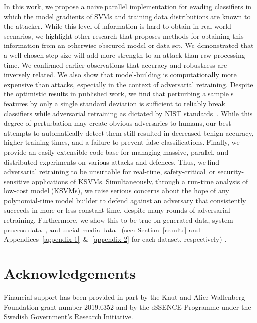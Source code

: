 \documentclass[fonts]{icst}
\begin{document}
In this work, we propose a naive parallel implementation for evading classifiers in which the model gradients of SVMs and training data distributions are known to the attacker.
While this level of information is hard to obtain in real-world scenarios, we highlight other research that proposes methods for obtaining this information from an otherwise obscured model or data-set.
We demonstrated that a   well-chosen step size will add more strength to an attack than raw processing time.
We confirmed earlier observations that accuracy and robustness are inversely related.
We also show that model-building is computationally more expensive than attacks, especially in the context of adversarial retraining.
Despite the optimistic results in published work, we find that perturbing a sample's features by only a single standard deviation is sufficient to reliably break classifiers while adversarial retraining as dictated by NIST standards~\cite{falco2006using}.
While this degree of perturbation may create obvious adversaries to humans, our best attempts to automatically detect them still resulted in decreased benign accuracy, higher training times, and a failure to prevent false classifications.
Finally, we provide an easily extensible code-base for managing massive, parallel, and distributed experiments on various attacks and defences.
Thus, we find adversarial retraining to be unsuitable for real-time, safety-critical, or security-sensitive applications of KSVMs.
Simultaneously, through a run-time analysis of low-cost model (KSVMs), we raise serious concerns about the hope of any polynomial-time model builder to defend against an adversary that consistently succeeds in more-or-less constant time, despite many rounds of adversarial retraining.
Furthermore, we show this to be true on generated data, system process data~\cite{kdd-nsl}, and social media data~\cite{truthseeker} (see: Section~\ref{results} and Appendices~\ref{appendix-1}~\&~\ref{appendix-2} for each dataset, respectively) .

\section{Acknowledgements}
Financial support has been provided in part by the Knut and Alice Wallenberg Foundation grant number 2019.0352 and by the eSSENCE Programme under the Swedish Government's Research Initiative.



\end{document}
